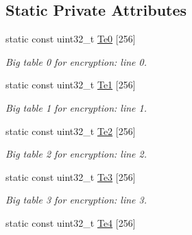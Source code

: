 \subsection*{Static Private Attributes}
\begin{DoxyCompactItemize}
\item 
\hypertarget{classAES_adbcbf38b7005ff6634ee812bcaa0ca0e}{}static const uint32\+\_\+t \hyperlink{classAES_adbcbf38b7005ff6634ee812bcaa0ca0e}{Te0} \mbox{[}256\mbox{]}\label{classAES_adbcbf38b7005ff6634ee812bcaa0ca0e}

\begin{DoxyCompactList}\small\item\em Big table 0 for encryption\+: line 0. \end{DoxyCompactList}\item 
\hypertarget{classAES_a20615b850cdc1e0e58d5340fca114ebe}{}static const uint32\+\_\+t \hyperlink{classAES_a20615b850cdc1e0e58d5340fca114ebe}{Te1} \mbox{[}256\mbox{]}\label{classAES_a20615b850cdc1e0e58d5340fca114ebe}

\begin{DoxyCompactList}\small\item\em Big table 1 for encryption\+: line 1. \end{DoxyCompactList}\item 
\hypertarget{classAES_a8b555815ada766628b9145508c74a4b5}{}static const uint32\+\_\+t \hyperlink{classAES_a8b555815ada766628b9145508c74a4b5}{Te2} \mbox{[}256\mbox{]}\label{classAES_a8b555815ada766628b9145508c74a4b5}

\begin{DoxyCompactList}\small\item\em Big table 2 for encryption\+: line 2. \end{DoxyCompactList}\item 
\hypertarget{classAES_ac1a86584b231b0130410afd19019fe29}{}static const uint32\+\_\+t \hyperlink{classAES_ac1a86584b231b0130410afd19019fe29}{Te3} \mbox{[}256\mbox{]}\label{classAES_ac1a86584b231b0130410afd19019fe29}

\begin{DoxyCompactList}\small\item\em Big table 3 for encryption\+: line 3. \end{DoxyCompactList}\item 
\hypertarget{classAES_ad31897dbad0abf9860df9b15a779d245}{}static const uint32\+\_\+t \hyperlink{classAES_ad31897dbad0abf9860df9b15a779d245}{Te4} \mbox{[}256\mbox{]}\label{classAES_ad31897dbad0abf9860df9b15a779d245}


\end{DoxyCompactItemize}
